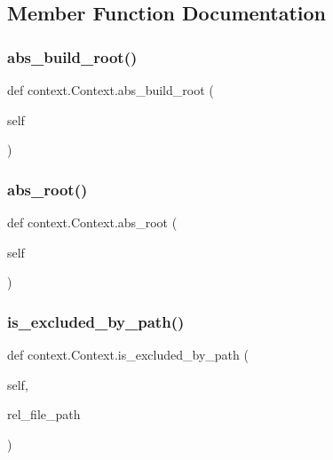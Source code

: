 \subsection{Member Function Documentation}
\mbox{\label{classcontext_1_1Context_a2f92bdbfdc008e134aa1a851d603b711}} 
\subsubsection{\texorpdfstring{abs\_build\_root()}{abs\_build\_root()}}
{\footnotesize\ttfamily def context.\+Context.\+abs\+\_\+build\+\_\+root (\begin{DoxyParamCaption}\item[{}]{self }\end{DoxyParamCaption})}

\mbox{\label{classcontext_1_1Context_ad4b88c518bc439aeb21a83d6ee4ca526}} 
\subsubsection{\texorpdfstring{abs\_root()}{abs\_root()}}
{\footnotesize\ttfamily def context.\+Context.\+abs\+\_\+root (\begin{DoxyParamCaption}\item[{}]{self }\end{DoxyParamCaption})}

\mbox{\label{classcontext_1_1Context_ac3e77d69e94fd565fbbc23c1a0d7a987}} 
\subsubsection{\texorpdfstring{is\_excluded\_by\_path()}{is\_excluded\_by\_path()}}
{\footnotesize\ttfamily def context.\+Context.\+is\+\_\+excluded\+\_\+by\+\_\+path (\begin{DoxyParamCaption}\item[{}]{self,  }\item[{}]{rel\+\_\+file\+\_\+path }\end{DoxyParamCaption})}

